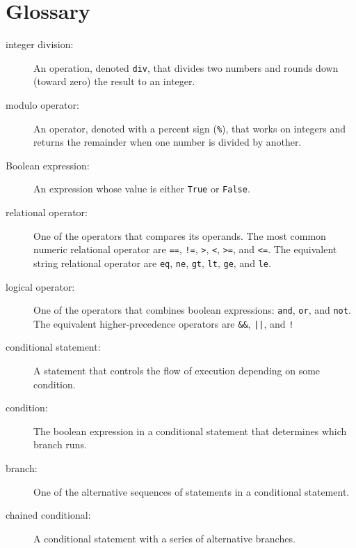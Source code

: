 \section{Glossary}

\begin{description}

\item[integer division:] An operation, denoted {\tt div}, 
that divides two numbers and rounds down (toward zero) the 
result to an integer.

\item[modulo operator:]  An operator, denoted with a percent sign
({\tt \%}), that works on integers and returns the remainder when one
number is divided by another.

\item[Boolean expression:]  An expression whose value is either 
{\tt True} or {\tt False}.

\item[relational operator:] One of the operators that compares
its operands. The most common numeric relational operator are  {\tt ==}, {\tt !=}, {\tt >}, {\tt <}, {\tt >=}, and {\tt <=}. The equivalent string relational operator are {\tt eq}, {\tt ne}, {\tt gt}, {\tt lt}, {\tt ge}, and {\tt le}.

\item[logical operator:] One of the operators that combines boolean
expressions: {\tt and}, {\tt or}, and {\tt not}. The equivalent higher-precedence operators are {\tt \&\&}, {\tt ||}, and {\tt !}

\item[conditional statement:]  A statement that controls the 
flow of execution depending on some condition.

\item[condition:] The boolean expression in a conditional 
statement that determines which branch runs.

\item[branch:] One of the alternative sequences of statements in
a conditional statement.

\item[chained conditional:]  A conditional statement with a 
series of alternative branches.


\end{description}
